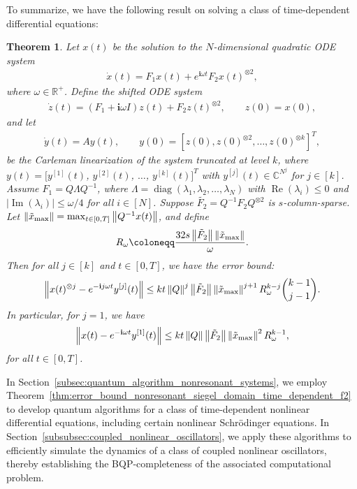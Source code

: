 \documentclass[superscriptaddress,onecolumn,nofootinbib,longbibliography,a4paper,accepted=2026-09-29]{quantumarticle}
\theoremstyle{plain}
\newtheorem{thm}{Theorem}
\theoremstyle{definition}
\numberwithin{thm}{section}
\numberwithin{assumption}{section}
\numberwithin{lemma}{section}
\numberwithin{prop}{section}
\numberwithin{cor}{section}
\numberwithin{definition}{section}
\numberwithin{rmk}{section}
\numberwithin{equation}{section}
\newcommand{\abs}[1]      {\left| #1 \right|}
\newcommand{\norm}[1]     {\left\| #1 \right\|}
\newcommand{\ot}{\otimes}
\newcommand{\R}{\mathbb{R}}
\newcommand{\myC}{\mathbb{C}}
\newcommand{\lrb}[1]{\left ( #1 \right )}
\newcommand{\defeq}{\coloneqq}
\renewcommand{\i}{\ensuremath{\mathbf{i}}}
\newcommand{\realpart}[1]{\operatorname{Re}\lrb{#1}}
\newcommand{\imaginarypart}[1]{\operatorname{Im}\lrb{#1}}
\newcommand{\diag}[1]{\operatorname{diag}\lrb{#1}}
\begin{document}
To summarize, we have the following result on solving a class of time-dependent differential equations:
\begin{thm}
\label{thm:resonant_oscillating_F2}
Let $x(t)$ be the solution to the $N$-dimensional quadratic ODE system
\begin{align}
    \dot{x}(t) = F_1 x(t) + e^{\i \omega t} F_2 x(t)^{\ot 2},
\end{align}
where $\omega \in \R^+$.
Define the shifted ODE system
\begin{align}
\dot{z}(t) = (F_1+\i \omega I) z(t)  + F_2 z(t)^{\otimes 2},  \qquad 
z(0)=x(0),
\end{align}
and let
\begin{align}
    \dot{y}(t) = A y(t),\qquad y(0)=[z(0),z(0)^{\ot 2},\dots,z(0)^{\ot k}]^T,
\end{align}
be the Carleman linearization of the system truncated at level $k$, where $y(t)=[y^{[1]}(t)$, $y^{[2]}(t)$, $\dots$, $y^{[k]}(t)]^T$ with $y^{[j]}(t) \in \myC^{N^j}$ for $j \in [k]$. Assume $F_1=Q\Lambda Q^{-1}$, where $\Lambda=\diag{\lambda_1, \lambda_2, \dots, \lambda_N}$ with $\realpart{\lambda_i} \le 0$ and $\abs{\imaginarypart{\lambda_i}} \le \omega/4$ for all $i \in [N]$. Suppose 
$\tilde{F_2}=Q^{-1}F_2Q^{\otimes 2}$ is $s$-column-sparse. Let $\norm{\tilde{x}_{\rm max}}=\max_{t \in [0,T]}\norm{Q^{-1}x(t)}$, and define
\begin{align}
    R_\omega \defeq  \frac{32 s \norm{\tilde{F}_2} \norm{\tilde{x}_{\rm max}}}{\omega}.
\end{align}
Then for all $j\in [k]$ and $t \in [0, T]$, we have the error bound:
\begin{align}
    \norm{x(t)^{\otimes j}-e^{-\i j \omega t}y^{[j]}(t)} \le k t \norm{Q}^j \norm{\tilde{F}_2} \norm{\tilde{x}_{\rm max}}^{j+1} R_\omega^{k-j} \binom{k-1}{j-1} .
\end{align}
In particular, for $j=1$, we have
\begin{align}
    \norm{x(t)-e^{-\i \omega t}y^{[1]}(t)} 
    \le k t \norm{Q} \norm{\tilde{F}_2} \norm{\tilde{x}_{\rm max}}^2 R_\omega^{k-1},    
\end{align}
for all $t \in [0, T]$.
\label{thm:error_bound_nonresonant_siegel_domain_time_dependent_f2}
\end{thm}

In Section~\ref{subsec:quantum_algorithm_nonresonant_systems}, we employ  Theorem~\ref{thm:error_bound_nonresonant_siegel_domain_time_dependent_f2} to develop quantum algorithms for a class of time-dependent nonlinear differential equations, including certain nonlinear Schr\"{o}dinger equations. In Section~\ref{subsubsec:coupled_nonlinear_oscillators}, we apply these algorithms to efficiently simulate the dynamics of a class of coupled nonlinear oscillators, thereby establishing the BQP-completeness of the associated computational problem.
\end{document}
